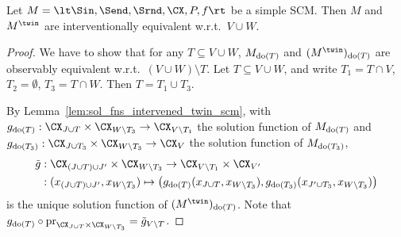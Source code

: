 \begin{Lem}\label{lem:int_equiv_twin_scm}
Let $M = \lt \Sin, \Send, \Srnd, \CX, P, f \rt$ be a simple SCM. Then
$M$ and $M^\twin$ are interventionally equivalent w.r.t.\ $V \cup W$.
\end{Lem}
\begin{proof}
  We have to show that for any $T \subseteq V \cup W$, 
  $M_{\operatorname{do}(T)}$ and $(M^{\twin})_{\doit(T)}$ are observably equivalent w.r.t.\ $(V \cup W) \setminus T$.
  Let $T \subseteq V \cup W$, and write $T_1 = T \cap V$, $T_2 = \emptyset$, $T_3 = T \cap W$. Then $T = T_1 \cup T_3$.

  By Lemma~\ref{lem:sol_fns_intervened_twin_scm},
with $g_{\doit(T)} : \CX_{J \cup T} \times \CX_{W \setminus T_3} \to \CX_{V \setminus T_1}$ the solution function of $M_{\operatorname{do}(T)}$ 
and $g_{\doit(T_3)} : \CX_{J \cup T_3} \times \CX_{W \setminus T_3} \to \CX_{V}$ the solution function of $M_{\operatorname{do}(T_3)}$,
  \begin{equation*}\begin{split}
    \tilde{g} & : \CX_{(J \cup T) \cup J'} \times \CX_{W \setminus T_3} \to \CX_{V \setminus T_1} \times \CX_{V'} \\
    & : (x_{(J \cup T) \cup J'}, x_{W \setminus T_3}) \mapsto \big(g_{\doit(T)}(x_{J \cup T},x_{W\setminus T_3}),g_{\doit(T_3)}(x_{J' \cup T_3},x_{W \setminus T_3})\big) 
  \end{split}\end{equation*}
  is the unique solution function of $(M^{\twin})_{\doit(T)}$. 
  Note that $g_{\doit(T)} \circ \pr_{\CX_{J\cup T} \times \CX_{W\setminus T_3}} = \tilde{g}_{V\setminus T}$.


\end{proof}
